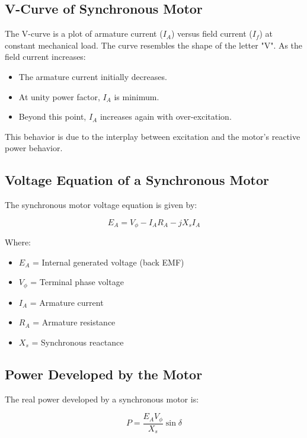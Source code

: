 \documentclass[a4paper,12pt]{article}
\begin{document}
	\subsection*{V-Curve of Synchronous Motor}
	The V-curve is a plot of armature current ($I_A$) versus field current ($I_f$) at constant mechanical load. The curve resembles the shape of the letter "V". As the field current increases:
	\begin{itemize}
		\item The armature current initially decreases.
		\item At unity power factor, $I_A$ is minimum.
		\item Beyond this point, $I_A$ increases again with over-excitation.
	\end{itemize}
	
	This behavior is due to the interplay between excitation and the motor’s reactive power behavior.
	
	\subsection*{Voltage Equation of a Synchronous Motor}
	
	The synchronous motor voltage equation is given by:
	
	\begin{equation}
		E_A = V_\phi - I_A R_A - jX_s I_A
	\end{equation}
	
	Where:
	\begin{itemize}
		\item $E_A$ = Internal generated voltage (back EMF)
		\item $V_\phi$ = Terminal phase voltage
		\item $I_A$ = Armature current
		\item $R_A$ = Armature resistance
		\item $X_s$ = Synchronous reactance
	\end{itemize}
	
	\subsection*{Power Developed by the Motor}
	
	The real power developed by a synchronous motor is:
	
	\begin{equation}
		P = \frac{E_A V_\phi}{X_s} \sin \delta
	\end{equation}
	
\end{document}
